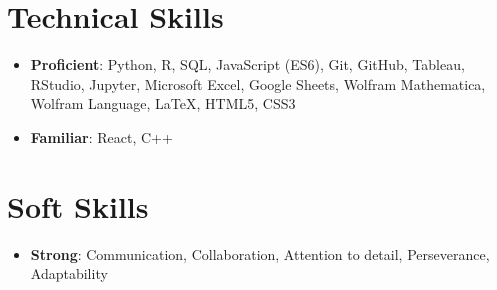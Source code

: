 \documentclass[letterpaper,10.8pt]{article}
\newcommand{\resumeItem}[2]{
  \item\small{
    \textbf{#1}{: #2 \vspace{-2pt}}
  }
}
\newcommand{\resumeSubItem}[2]{\resumeItem{#1}{#2}\vspace{-4pt}}
\newcommand{\resumeSubHeadingListStart}{\begin{itemize}[leftmargin=*]}
\newcommand{\resumeSubHeadingListEnd}{\end{itemize}}
\begin{document}
\section{Technical Skills}
\resumeSubHeadingListStart
\resumeSubItem{Proficient}{Python, R, SQL, JavaScript (ES6), Git, GitHub, Tableau, RStudio, Jupyter, Microsoft Excel, Google Sheets, Wolfram Mathematica, Wolfram Language, LaTeX, HTML5, CSS3}
\resumeSubItem{Familiar}{React, C++}
\resumeSubHeadingListEnd

\section{Soft Skills}
\resumeSubHeadingListStart
\resumeSubItem{Strong}{Communication, Collaboration, Attention to detail, Perseverance, Adaptability}
\resumeSubHeadingListEnd
\end{document}
